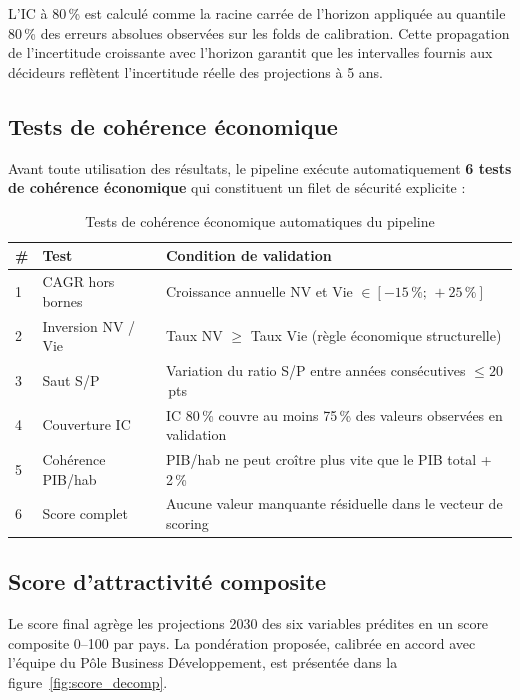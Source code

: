 \documentclass[12pt,a4paper]{report}
\begin{document}
L'IC à 80\,\% est calculé comme la racine carrée de l'horizon appliquée au quantile 80\,\% des erreurs absolues observées sur les folds de calibration. Cette propagation de l'incertitude croissante avec l'horizon garantit que les intervalles fournis aux décideurs reflètent l'incertitude réelle des projections à 5 ans.

\subsection{Tests de cohérence économique}

Avant toute utilisation des résultats, le pipeline exécute automatiquement \textbf{6 tests de cohérence économique} qui constituent un filet de sécurité explicite :

\begin{table}[H]
\centering
\caption{Tests de cohérence économique automatiques du pipeline}
\label{tab:tests_coherence}
\small
\begin{tabularx}{\textwidth}{@{}p{0.4cm}p{4cm}X@{}}
\toprule
\textbf{\#} & \textbf{Test} & \textbf{Condition de validation} \\
\midrule
1 & CAGR hors bornes & Croissance annuelle NV et Vie $\in [-15\,\%;\,+25\,\%]$ \\
2 & Inversion NV / Vie & Taux NV $\geq$ Taux Vie (règle économique structurelle) \\
3 & Saut S/P & Variation du ratio S/P entre années consécutives $\leq 20$\,pts \\
4 & Couverture IC & IC 80\,\% couvre au moins 75\,\% des valeurs observées en validation \\
5 & Cohérence PIB/hab & PIB/hab ne peut croître plus vite que le PIB total + 2\,\% \\
6 & Score complet & Aucune valeur manquante résiduelle dans le vecteur de scoring \\
\bottomrule
\end{tabularx}
\end{table}

\subsection{Score d'attractivité composite}

Le score final agrège les projections 2030 des six variables prédites en un score composite 0--100 par pays. La pondération proposée, calibrée en accord avec l'équipe du Pôle Business Développement, est présentée dans la figure~\ref{fig:score_decomp}.
\end{document}
